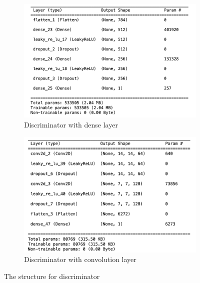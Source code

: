 \begin{figure}[H]
    \centering
    \begin{subfigure}[b]{0.45\linewidth}
        \centering
        \includegraphics[width=\linewidth]{./Images/discriminator_dense.jpg}
        \caption{Discriminator with dense layer}
        \label{fig:Dense}
    \end{subfigure}
    \hspace{0.05\linewidth}
    \begin{subfigure}[b]{0.45\linewidth}
        \centering
        \includegraphics[width=\linewidth]{./Images/discriminator_cnn.jpg}
        \caption{Discriminator with convolution layer}
        \label{fig:Conv2D Transpose}
    \end{subfigure}
    \caption{The structure for discriminator}
    \label{fig:combined}
\end{figure}


